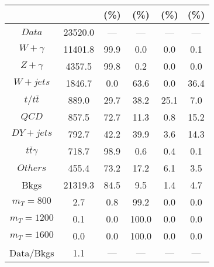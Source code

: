 \begin{figure}
\begin{minipage}[c]{0.32\textwidth}
{\begin{tabular}{cccccc}
 &  & (\%) & (\%) & (\%) & (\%)  \\
\hline
                                                                      $ Data $ &  23520.0 &  --- &  --- &  --- &  ---\\
$ W+\gamma $ &  11401.8 &  99.9 &  0.0 &  0.0 &  0.1\\
$ Z+\gamma $ &  4357.5 &  99.8 &  0.2 &  0.0 &  0.0\\
$ W+jets $ &  1846.7 &  0.0 &  63.6 &  0.0 &  36.4\\
$ t/t\bar{t} $ &  889.0 &  29.7 &  38.2 &  25.1 &  7.0\\
$ QCD $ &  857.5 &  72.7 &  11.3 &  0.8 &  15.2\\
$ DY+jets $ &  792.7 &  42.2 &  39.9 &  3.6 &  14.3\\
$ t\bar{t}\gamma $ &  718.7 &  98.9 &  0.6 &  0.4 &  0.1\\
$ Others $ &  455.4 &  73.2 &  17.2 &  6.1 &  3.5\\
Bkgs &  21319.3 &  84.5 &  9.5 &  1.4 &  4.7\\
$ m_{T} = 800 $ &  2.7 &  0.8 &  99.2 &  0.0 &  0.0\\
$ m_{T} = 1200 $ &  0.1 &  0.0 &  100.0 &  0.0 &  0.0\\
$ m_{T} = 1600 $ &  0.0 &  0.0 &  100.0 &  0.0 &  0.0\\
Data/Bkgs &  1.1 &  --- &  --- &  --- &  ---\\
\hline
\end{tabular}
}
\end{minipage}
\end{figure}

